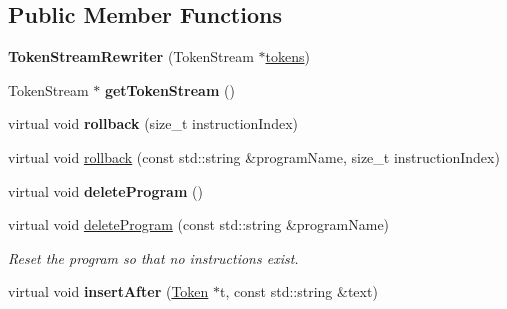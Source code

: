 \subsection*{Public Member Functions}
\begin{DoxyCompactItemize}
\item 
\mbox{\label{classantlr4_1_1TokenStreamRewriter_abe00be20122c4090b33c9dddcb7329ca}} 
{\bfseries Token\+Stream\+Rewriter} (Token\+Stream $\ast$\hyperlink{classantlr4_1_1TokenStreamRewriter_ac75597fb40771420ffa19c461b62da79}{tokens})
\item 
\mbox{\label{classantlr4_1_1TokenStreamRewriter_af3a0abc00494409aac1a7855ed988baf}} 
Token\+Stream $\ast$ {\bfseries get\+Token\+Stream} ()
\item 
\mbox{\label{classantlr4_1_1TokenStreamRewriter_a586b43ab6cdddf5ce7b828d9b08c0b8e}} 
virtual void {\bfseries rollback} (size\+\_\+t instruction\+Index)
\item 
virtual void \hyperlink{classantlr4_1_1TokenStreamRewriter_a21638a1ba5de5af913f8c087cc271f56}{rollback} (const std\+::string \&program\+Name, size\+\_\+t instruction\+Index)
\item 
\mbox{\label{classantlr4_1_1TokenStreamRewriter_a9f39078c41ca619e8ecbaa4a6cce98ba}} 
virtual void {\bfseries delete\+Program} ()
\item 
\mbox{\label{classantlr4_1_1TokenStreamRewriter_a389e2b7e934105379be772b9b15d9c43}} 
virtual void \hyperlink{classantlr4_1_1TokenStreamRewriter_a389e2b7e934105379be772b9b15d9c43}{delete\+Program} (const std\+::string \&program\+Name)
\begin{DoxyCompactList}\small\item\em Reset the program so that no instructions exist. \end{DoxyCompactList}\item 
\mbox{\label{classantlr4_1_1TokenStreamRewriter_a7b5971db6c0ab1e9a72c04b068c9171c}} 
virtual void {\bfseries insert\+After} (\hyperlink{classantlr4_1_1Token}{Token} $\ast$t, const std\+::string \&text)
\item 

\end{DoxyCompactItemize}
